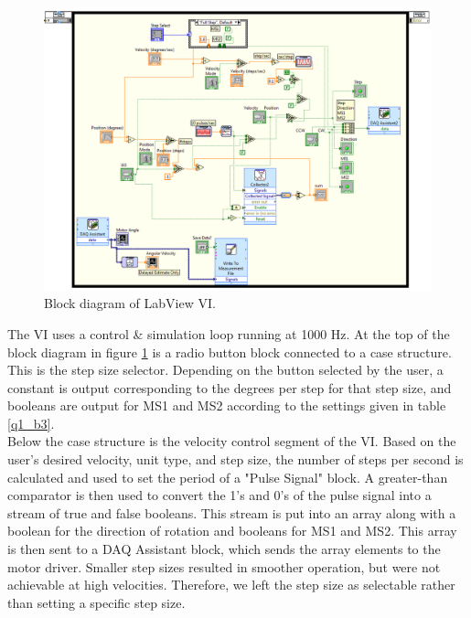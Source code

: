 \documentclass{article}
\theoremstyle{plain}
\theoremstyle{definition}
\theoremstyle{remark}
\begin{document}
\begin{figure}[hbt]
\begin{center}
\includegraphics[width = 18cm]{VIBlockDiagram.png}
\caption{Block diagram of LabView VI.}
\label{q2_2}
\end{center}
\end{figure}

The VI uses a control \& simulation loop running at 1000 Hz. At the top of the block diagram in figure \ref{q2_2} is a radio button block connected to a case structure. This is the step size selector. Depending on the button selected by the user, a constant is output corresponding to the degrees per step for that step size, and booleans are output for MS1 and MS2 according to the settings given in table \ref{q1_b3}.\\

Below the case structure is the velocity control segment of the VI. Based on the user's desired velocity, unit type, and step size, the number of steps per second is calculated and used to set the period of a "Pulse Signal" block. A greater-than comparator is then used to convert the 1's and 0's of the pulse signal into a stream of true and false booleans. This stream is put into an array along with a boolean for the direction of rotation and booleans for MS1 and MS2. This array is then sent to a DAQ Assistant block, which sends the array elements to the motor driver. Smaller step sizes resulted in smoother operation, but were not achievable at high velocities. Therefore, we left the step size as selectable rather than setting a specific step size.\\
\end{document}
